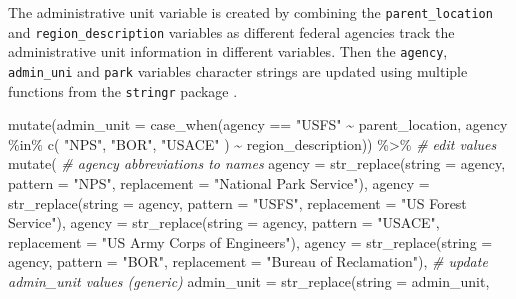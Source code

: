 \documentclass[
]{book}
\newenvironment{Shaded}{\begin{snugshade}}{\end{snugshade}}
\newcommand{\AttributeTok}[1]{\textcolor[rgb]{0.77,0.63,0.00}{#1}}
\newcommand{\CommentTok}[1]{\textcolor[rgb]{0.56,0.35,0.01}{\textit{#1}}}
\newcommand{\FunctionTok}[1]{\textcolor[rgb]{0.00,0.00,0.00}{#1}}
\newcommand{\NormalTok}[1]{#1}
\newcommand{\SpecialCharTok}[1]{\textcolor[rgb]{0.00,0.00,0.00}{#1}}
\newcommand{\StringTok}[1]{\textcolor[rgb]{0.31,0.60,0.02}{#1}}
\begin{document}
The administrative unit variable is created by combining the \texttt{parent\_location} and \texttt{region\_description} variables as different federal agencies track the administrative unit information in different variables. Then the \texttt{agency}, \texttt{admin\_uni} and \texttt{park} variables character strings are updated using multiple functions from the \texttt{stringr} package \citep{R-stringr}.

\begin{Shaded}
\begin{Highlighting}[]
\FunctionTok{mutate}\NormalTok{(}\AttributeTok{admin\_unit =} 
         \FunctionTok{case\_when}\NormalTok{(agency }\SpecialCharTok{==} \StringTok{"USFS"} \SpecialCharTok{\textasciitilde{}}\NormalTok{ parent\_location,}
\NormalTok{                   agency }\SpecialCharTok{\%in\%} \FunctionTok{c}\NormalTok{(}
                     \StringTok{"NPS"}\NormalTok{, }\StringTok{"BOR"}\NormalTok{, }\StringTok{"USACE"}
\NormalTok{                   ) }\SpecialCharTok{\textasciitilde{}}\NormalTok{ region\_description)) }\SpecialCharTok{\%\textgreater{}\%} 
  \CommentTok{\# edit values}
  \FunctionTok{mutate}\NormalTok{(}
    \CommentTok{\# agency abbreviations to names}
    \AttributeTok{agency =} \FunctionTok{str\_replace}\NormalTok{(}\AttributeTok{string =}\NormalTok{ agency,}
                         \AttributeTok{pattern =} \StringTok{"NPS"}\NormalTok{,}
                         \AttributeTok{replacement =} \StringTok{"National Park Service"}\NormalTok{),}
    \AttributeTok{agency =} \FunctionTok{str\_replace}\NormalTok{(}\AttributeTok{string =}\NormalTok{ agency,}
                         \AttributeTok{pattern =} \StringTok{"USFS"}\NormalTok{, }
                         \AttributeTok{replacement =} \StringTok{"US Forest Service"}\NormalTok{),}
    \AttributeTok{agency =} \FunctionTok{str\_replace}\NormalTok{(}\AttributeTok{string =}\NormalTok{ agency,}
                         \AttributeTok{pattern =} \StringTok{"USACE"}\NormalTok{,}
                         \AttributeTok{replacement =} \StringTok{"US Army Corps of Engineers"}\NormalTok{),}
    \AttributeTok{agency =} \FunctionTok{str\_replace}\NormalTok{(}\AttributeTok{string =}\NormalTok{ agency,}
                         \AttributeTok{pattern =} \StringTok{"BOR"}\NormalTok{,}
                         \AttributeTok{replacement =} \StringTok{"Bureau of Reclamation"}\NormalTok{),}
    \CommentTok{\# update admin\_unit values (generic)}
    \AttributeTok{admin\_unit =} \FunctionTok{str\_replace}\NormalTok{(}\AttributeTok{string =}\NormalTok{ admin\_unit,}

\end{Highlighting}
\end{Shaded}
\end{document}
